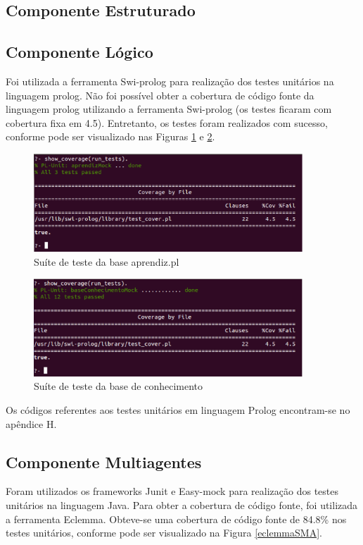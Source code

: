 \subsection{Componente Estruturado}
\subsection{Componente Lógico}
Foi utilizada a ferramenta Swi-prolog para realização dos testes unitários na linguagem prolog. Não foi possível obter a cobertura de código fonte da linguagem prolog utilizando a ferramenta Swi-prolog (os testes ficaram com cobertura fixa em 4.5). Entretanto, os testes foram realizados com sucesso, conforme pode ser visualizado nas Figuras \ref{prologTeste1} e \ref{prologTeste2}. 

\begin{figure}[H]
\centering
\includegraphics[width=0.9\textwidth]{figuras/prologTeste1}
\caption{Suíte de teste da base aprendiz.pl}
\label{prologTeste1}
\end{figure}

\begin{figure}[H]
\centering
\includegraphics[width=0.9\textwidth]{figuras/prologTeste2}
\caption{Suíte de teste da base de conhecimento}
\label{prologTeste2}
\end{figure}

Os códigos referentes aos testes unitários em linguagem Prolog encontram-se no apêndice H.

\subsection{Componente Multiagentes}
Foram utilizados os frameworks Junit e Easy-mock para realização dos testes unitários na linguagem Java. Para obter a cobertura de código fonte, foi utilizada a ferramenta Eclemma. Obteve-se uma cobertura de código fonte de 84.8\% nos testes unitários, conforme pode ser visualizado na Figura \ref{eclemmaSMA}. 

